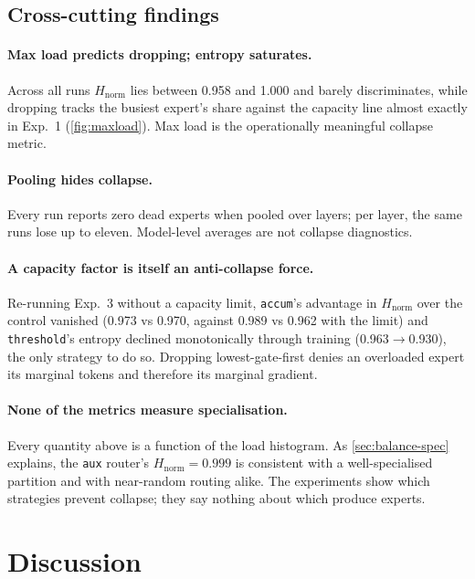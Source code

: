 \documentclass[10pt]{article}
\theoremstyle{definition}
\theoremstyle{remark}
\newcommand{\Hn}{H_{\mathrm{norm}}}
\newcommand{\code}[1]{\texttt{#1}}
\begin{document}
\FloatBarrier
\subsection{Cross-cutting findings}
\label{sec:cross}

\paragraph{Max load predicts dropping; entropy saturates.} Across all runs $\Hn$ lies between 0.958 and 1.000 and barely discriminates, while dropping tracks the busiest expert's share against the capacity line almost exactly in Exp.~1 (\cref{fig:maxload}). Max load is the operationally meaningful collapse metric.

\paragraph{Pooling hides collapse.} Every run reports zero dead experts when pooled over layers; per layer, the same runs lose up to eleven. Model-level averages are not collapse diagnostics.

\paragraph{A capacity factor is itself an anti-collapse force.} Re-running Exp.~3 without a capacity limit, \code{accum}'s advantage in $\Hn$ over the control vanished (0.973 vs 0.970, against 0.989 vs 0.962 with the limit) and \code{threshold}'s entropy declined monotonically through training (0.963$\to$0.930), the only strategy to do so. Dropping lowest-gate-first denies an overloaded expert its marginal tokens and therefore its marginal gradient.

\paragraph{None of the metrics measure specialisation.} Every quantity above is a function of the load histogram. As \cref{sec:balance-spec} explains, the \code{aux} router's $\Hn=0.999$ is consistent with a well-specialised partition and with near-random routing alike. The experiments show which strategies prevent collapse; they say nothing about which produce experts.

\section{Discussion}
\label{sec:discussion}
\end{document}
